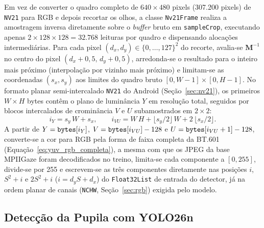 Em vez de converter o quadro completo de $640 \times 480$ pixels (307.200 pixels) de \texttt{NV21} para RGB e depois recortar os olhos, a classe \texttt{Nv21Frame} realiza a amostragem inversa diretamente sobre o \textit{buffer} bruto em \texttt{sampleCrop}, executando apenas $2 \times 128 \times 128 = 32.768$ leituras por quadro e dispensando alocações intermediárias. Para cada pixel $(d_x, d_y) \in \{0, \ldots, 127\}^2$ do recorte, avalia-se $\mathbf{M}^{-1}$ no centro do pixel $(d_x + 0{,}5,\, d_y + 0{,}5)$, arredonda-se o resultado para o inteiro mais próximo (interpolação por vizinho mais próximo) e limitam-se as coordenadas $(s_x, s_y)$ aos limites do quadro bruto $[0, W-1] \times [0, H-1]$. No formato planar semi-intercalado \texttt{NV21} do Android (Seção~\ref{sec:nv21}), os primeiros $W \times H$ bytes contêm o plano de luminância $Y$ em resolução total, seguidos por blocos intercalados de crominância $V$ e $U$ subamostrados em $2 \times 2$:
\begin{equation}
    i_Y = s_y\,W + s_x, \qquad
    i_{ VU } = W\,H + \lfloor s_y / 2 \rfloor\,W + 2\,\lfloor s_x / 2 \rfloor.
    \label{eq:indices_nv21}
\end{equation}
A partir de $Y = \text{\texttt{bytes}}[i_Y]$, $V = \text{\texttt{bytes}}[i_{VU}] - 128$ e $U = \text{\texttt{bytes}}[i_{VU} + 1] - 128$, converte-se a cor para RGB pela forma de faixa completa da BT.601 (Equação~\ref{eq:yuv_rgb_completa}), a mesma com que os JPEG da base MPIIGaze foram decodificados no treino, limita-se cada componente a $[0, 255]$, divide-se por 255 e escrevem-se as três componentes diretamente nas posições $i$, $S^2 + i$ e $2S^2 + i$ ($i = d_y S + d_x$) do \texttt{Float32List} de entrada do detector, já na ordem planar de canais (\texttt{NCHW}, Seção~\ref{sec:rgb}) exigida pelo modelo.

\subsection{Detecção da Pupila com YOLO26n} \label{sec:met_pupila}

